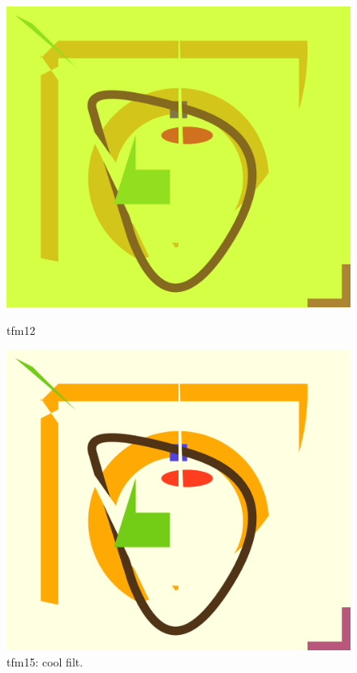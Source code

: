 \documentclass[12pt]{article}
\begin{document}
\begin{figure}[h]
	\centering
	\begin{minipage}[b]{0.3\textwidth}
		\includegraphics[width=\textwidth]{./pdf/main-test-out-12.pdf}
		\caption{tfm12}
	\end{minipage}
	\hfill
	\begin{minipage}[b]{0.3\textwidth}
		\includegraphics[width=\textwidth]{./pdf/main-test-out-15.pdf}
		\caption{tfm15: cool filt.}

\end{minipage}
\end{figure}
\end{document}
